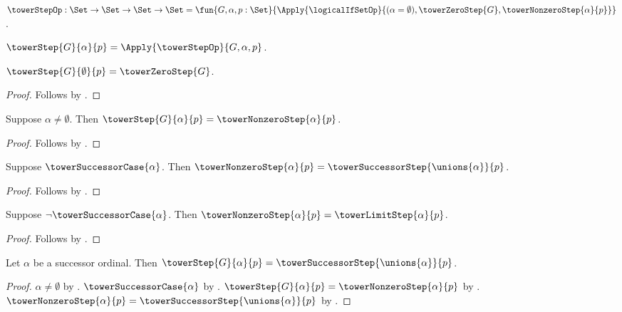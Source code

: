 \begin{definition}\label{tower_step_op}
    $\towerStepOp:\Set\to\Set\to\Set\to\Set
        =\fun{G,\alpha,p:\Set}{
            \Apply{\logicalIfSetOp}{(\alpha=\emptyset),\towerZeroStep{G},
                \towerNonzeroStep{\alpha}{p}}}$.
\end{definition}

\begin{abbreviation}\label{tower_step}
    $\towerStep{G}{\alpha}{p}=
        \Apply{\towerStepOp}{G,\alpha,p}$.
\end{abbreviation}

\begin{proposition}\label{tower_step_zero}
    $\towerStep{G}{\emptyset}{p}=\towerZeroStep{G}$.
\end{proposition}
\begin{proof}
    Follows by
        .
\end{proof}

\begin{proposition}\label{tower_step_nonzero}
    Suppose $\alpha\neq\emptyset$.
    Then $\towerStep{G}{\alpha}{p}=\towerNonzeroStep{\alpha}{p}$.
\end{proposition}
\begin{proof}
    Follows by
        .
\end{proof}

\begin{proposition}\label{tower_nonzero_step_successor_case}
    Suppose $\towerSuccessorCase{\alpha}$.
    Then $\towerNonzeroStep{\alpha}{p}=
        \towerSuccessorStep{\unions{\alpha}}{p}$.
\end{proposition}
\begin{proof}
    Follows by
        .
\end{proof}

\begin{proposition}\label{tower_nonzero_step_limit_case}
    Suppose $\lnot\towerSuccessorCase{\alpha}$.
    Then $\towerNonzeroStep{\alpha}{p}=\towerLimitStep{\alpha}{p}$.
\end{proposition}
\begin{proof}
    Follows by
        .
\end{proof}

\begin{proposition}\label{tower_step_successor_ordinal}
    Let $\alpha$ be a successor ordinal.
    Then $\towerStep{G}{\alpha}{p}=
        \towerSuccessorStep{\unions{\alpha}}{p}$.
\end{proposition}
\begin{proof}
    $\alpha\neq\emptyset$ by
        .
    $\towerSuccessorCase{\alpha}$ by
        .
    $\towerStep{G}{\alpha}{p}=\towerNonzeroStep{\alpha}{p}$ by
        .
    $\towerNonzeroStep{\alpha}{p}=
        \towerSuccessorStep{\unions{\alpha}}{p}$ by
        .
\end{proof}

